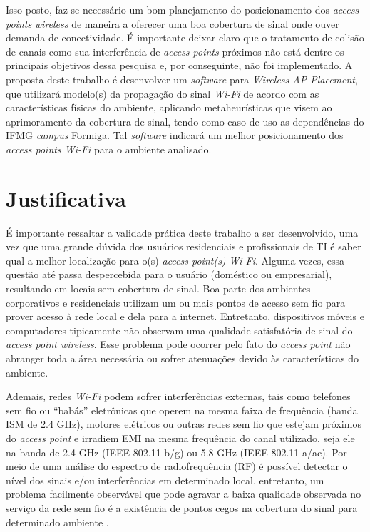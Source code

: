 \documentclass[
	12pt,				%
	twoside,			%
	a4paper,			%
	english,			%
	french,				%
	spanish,			%
	brazil				%
	]{abntex2}
\begin{document}
Isso posto, faz-se necessário um bom planejamento do posicionamento dos
\emph{access points} \emph{wireless} de maneira a oferecer uma boa
cobertura de sinal onde ouver demanda de conectividade. É importante
deixar claro que o tratamento de colisão de canais como sua
interferência de \emph{access points} próximos não está dentre os
principais objetivos dessa pesquisa e, por conseguinte, não foi
implementado. A proposta deste trabalho é desenvolver um \emph{software}
para \emph{Wireless AP Placement}, que utilizará modelo(s) da propagação
do sinal \emph{Wi-Fi} de acordo com as características físicas do
ambiente, aplicando metaheurísticas que visem ao aprimoramento da
cobertura de sinal, tendo como caso de uso as dependências do IFMG
\emph{campus} Formiga. Tal \emph{software} indicará um melhor
posicionamento dos \emph{access points Wi-Fi} para o ambiente analisado.

\section{Justificativa}\label{justificativa}

É importante ressaltar a validade prática deste trabalho a ser
desenvolvido, uma vez que uma grande dúvida dos usuários residenciais e
profissionais de TI é saber qual a melhor localização para o(s)
\emph{access point(s)} \emph{Wi-Fi}. Alguma vezes, essa questão até
passa despercebida para o usuário (doméstico ou empresarial), resultando
em locais sem cobertura de sinal. Boa parte dos ambientes corporativos e
residenciais utilizam um ou mais pontos de acesso sem fio para prover
acesso à rede local e dela para a internet. Entretanto, dispositivos
móveis e computadores tipicamente não observam uma qualidade
satisfatória de sinal do \emph{access point wireless}. Esse problema
pode ocorrer pelo fato do \emph{access point} não abranger toda a área
necessária ou sofrer atenuações devido às características do ambiente.

Ademais, redes \emph{Wi-Fi} podem sofrer interferências externas, tais
como telefones sem fio ou ``babás'' eletrônicas que operem na mesma
faixa de frequência (banda ISM de 2.4 GHz), motores elétricos ou outras
redes sem fio que estejam próximos do \emph{access point} e irradiem EMI
na mesma frequência do canal utilizado, seja ele na banda de 2.4 GHz
(IEEE 802.11 b/g) ou 5.8 GHz (IEEE 802.11 a/ac). Por meio de uma análise
do espectro de radiofrequência (RF) é possível detectar o nível dos
sinais e/ou interferências em determinado local, entretanto, um problema
facilmente observável que pode agravar a baixa qualidade observada no
serviço da rede sem fio é a existência de pontos cegos na cobertura do
sinal para determinado ambiente \cite{RUBINSTEINS}.
\end{document}
